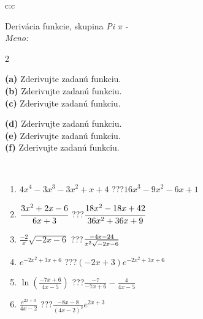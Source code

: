 \documentclass[10pt]{report}
\begin{document}
\newpage
\thispagestyle{empty}
\begin{tabular}{c:c}
\begin{minipage}[c][104.5mm][t]{0.5\linewidth}
\begin{center}
\vspace{7mm}
{\huge Derivácia funkcie, skupina \textit{Pi $\pi$} -}\\[5mm]
\textit{Meno:}\phantom{xxxxxxxxxxxxxxxxxxxxxxxxxxxxxxxxxxxxxxxxxxxxxxxxxxxxxxxxxxxxxxxxx}\\[5mm]
\begin{minipage}{0.95\linewidth}
\begin{center}
{\small \begin{multicols}{2} \raggedright
\textbf{(a)} Zderivujte zadanú funkciu. \\[1mm]
\textbf{(b)} Zderivujte zadanú funkciu. \\[1mm]
\textbf{(c)} Zderivujte zadanú funkciu. \par \columnbreak
\textbf{(d)} Zderivujte zadanú funkciu. \\[1mm]
\textbf{(e)} Zderivujte zadanú funkciu. \\[1mm]
\textbf{(f)} Zderivujte zadanú funkciu.
\end{multicols}
}
\end{center}
\end{minipage}
\\[4mm]
\begin{minipage}{0.79\linewidth}
\begin{center}
\begin{varwidth}{\linewidth}
\begin{enumerate}
\normalsize
\item $4x^4-3x^3-3x^2+x+4$\quad \dotfill\; ???\;\dotfill \quad $16x^3-9x^2-6x+1$
\item $\cfrac{3x^2+2x-6}{6x+3}$\quad \dotfill\; ???\;\dotfill \quad $\cfrac{18x^2-18x+42}{36x^2+36x+9}$
\item $\frac{-2}{x}\sqrt{-2x-6}$\quad \dotfill\; ???\;\dotfill \quad $\frac{-4x-24}{x^2 \sqrt{\smash[b]{-2x-6}}}$
\item $e^{-2x^2+3x+6}$\quad \dotfill\; ???\;\dotfill \quad $(-2x+3)e^{-2x^2+3x+6}$
\item $\ln{\left(\frac{-7x+6}{4x-5}\right)}$\quad \dotfill\; ???\;\dotfill \quad $\frac{-7}{-7x+6}-\frac{4}{4x-5}$
\item $\frac{e^{2x+3}}{4x-2}$\quad \dotfill\; ???\;\dotfill \quad $\frac{-8x-8}{(4x-2)^2}e^{2x+3}$
\end{enumerate}

\end{varwidth}
\end{center}
\end{minipage}
\end{center}
\end{minipage}
\end{tabular}
\end{document}
